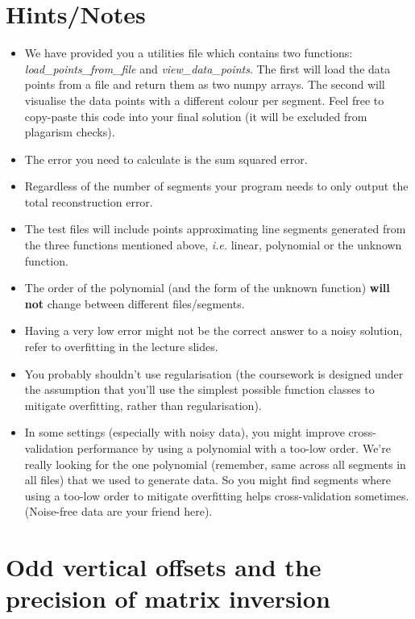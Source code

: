 \documentclass[10pt]{article}
\begin{document}
\section{Hints/Notes}
\label{sec:hints/notes}
\begin{itemize}
    \item We have provided you a utilities file which contains two functions: \textit{load\_points\_from\_file} and \textit{view\_data\_points}.
        The first will load the data points from a file and return them as two numpy arrays.
        The second will visualise the data points with a different colour per segment.
        Feel free to copy-paste this code into your final solution (it will be excluded from plagarism checks).
    \item The error you need to calculate is the sum squared error. 
    \item Regardless of the number of segments your program needs to only output the total reconstruction error. 
    \item The test files will include points approximating line segments generated from the three functions mentioned above, \textit{i.e.} linear, polynomial or the unknown function. 
    \item The order of the polynomial (and the form of the unknown function) \textbf{will not} change between different files/segments.
    \item Having a very low error might not be the correct answer to a noisy solution, refer to overfitting in the lecture slides. 
    \item You probably shouldn't use regularisation (the coursework is designed under the assumption that you'll use the simplest possible function classes to mitigate overfitting, rather than regularisation).
    \item In some settings (especially with noisy data), you might improve cross-validation performance by using a polynomial with a too-low order.  We're really looking for the one polynomial (remember, same across all segments in all files) that we used to generate data.  So you might find segments where using a too-low order to mitigate overfitting helps cross-validation sometimes.  (Noise-free data are your friend here).
\end{itemize}

\appendix

\section{Odd vertical offsets and the precision of matrix inversion}
\end{document}
